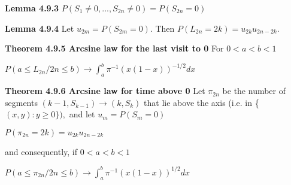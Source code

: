 \documentclass{article}
\begin{document}
\textbf {Lemma 4.9.3} $P(S_1 \neq 0 ,..., S_{2n} \neq 0) = P(S_{2n} = 0)$

\textbf {Lemma 4.9.4} Let $u_{2m} = P(S_{2m} = 0)$. Then $P(L_{2n} = 2k) = u_{2k} u_{2n-2k}$.

\textbf {Theorem 4.9.5 Arcsine law for the last visit to 0} For $0 < a < b < 1$
\begin{center}
$P(a \leq L_{2n} / 2n \leq b) \to \int_a^b \pi^{-1}(x(1-x))^{-1/2} dx$
\end{center}

\textbf {Theorem 4.9.6 Arcsine law for time above 0} Let $\pi_{2n}$ be the number of segments $(k-1, S_{k-1}) \to (k, S_k)$ that lie above the axis (i.e. in \{$(x,y): y \geq 0 \}),$ and let $u_m = P(S_m = 0)$ 
\begin{center}
$P(\pi_{2n} = 2k) = u_{2k}u_{2n-2k}$
\end{center}
and consequently, if $0 < a < b < 1$
\begin{center}
$P(a \leq \pi_{2n} / 2n \leq b) \to \int_a^b \pi^{-1} (x(1-x))^{1/2} dx$
\end{center}
\end{document}

